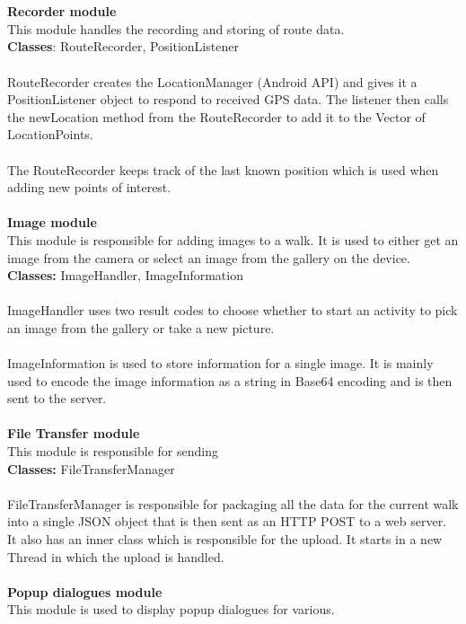 \documentclass[12pt]{article}
\begin{document}
~\\\\
\textbf{Recorder module}~\\
This module handles the recording and storing of route data.~\\
\textbf{Classes}: RouteRecorder, PositionListener~\\\\
RouteRecorder creates the LocationManager (Android API) and gives it a PositionListener object to respond to received GPS data. The listener then calls the newLocation method from the RouteRecorder to add it to the Vector of LocationPoints.~\\\\
The RouteRecorder keeps track of the last known position which is used when adding new points of interest. 
~\\\\
\textbf{Image module}~\\
This module is responsible for adding images to a walk. It is used to either get an image from the camera or select an image from the gallery on the device. ~\\
\textbf{Classes:} ImageHandler, ImageInformation
~\\\\ImageHandler uses two result codes to choose whether to start an activity to pick an image from the gallery or take a new picture.~\\\\
ImageInformation is used to store information for a single image. It is mainly used to encode the image information as a string in Base64 encoding and is then sent to the server.~\\\\
\textbf{File Transfer module}~\\
This module is responsible for sending~\\
\textbf{Classes:} FileTransferManager ~\\\\
FileTransferManager is responsible for packaging all the data for the current walk into a single JSON object that is then sent as an HTTP POST to a web server. It also has an inner class which is responsible for the upload. It starts in a new Thread in which the upload is handled.~\\\\
\textbf{Popup dialogues module}~\\
This module is used to display popup dialogues for various.~\\ 
\end{document}

